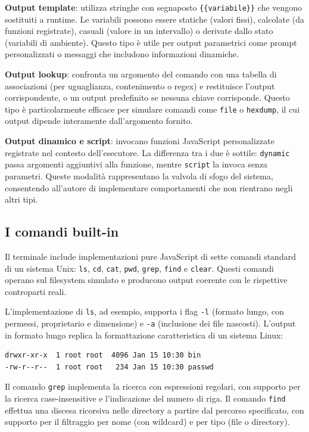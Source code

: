 \textbf{Output template}: utilizza stringhe con segnaposto \texttt{\{\{variabile\}\}} che vengono sostituiti a runtime. Le variabili possono essere statiche (valori fissi), calcolate (da funzioni registrate), casuali (valore in un intervallo) o derivate dallo stato (variabili di ambiente). Questo tipo è utile per output parametrici come prompt personalizzati o messaggi che includono informazioni dinamiche.

\textbf{Output lookup}: confronta un argomento del comando con una tabella di associazioni (per uguaglianza, contenimento o regex) e restituisce l'output corrispondente, o un output predefinito se nessuna chiave corrisponde. Questo tipo è particolarmente efficace per simulare comandi come \texttt{file} o \texttt{hexdump}, il cui output dipende interamente dall'argomento fornito.

\textbf{Output dinamico e script}: invocano funzioni JavaScript personalizzate registrate nel contesto dell'esecutore. La differenza tra i due è sottile: \texttt{dynamic} passa argomenti aggiuntivi alla funzione, mentre \texttt{script} la invoca senza parametri. Queste modalità rappresentano la valvola di sfogo del sistema, consentendo all'autore di implementare comportamenti che non rientrano negli altri tipi.

\subsection{I comandi built-in}

Il terminale include implementazioni pure JavaScript di sette comandi standard di un sistema Unix: \texttt{ls}, \texttt{cd}, \texttt{cat}, \texttt{pwd}, \texttt{grep}, \texttt{find} e \texttt{clear}. Questi comandi operano sul filesystem simulato e producono output coerente con le rispettive controparti reali.

L'implementazione di \texttt{ls}, ad esempio, supporta i flag \texttt{-l} (formato lungo, con permessi, proprietario e dimensione) e \texttt{-a} (inclusione dei file nascosti). L'output in formato lungo replica la formattazione caratteristica di un sistema Linux:

\begin{lstlisting}
drwxr-xr-x  1 root root  4096 Jan 15 10:30 bin
-rw-r--r--  1 root root   234 Jan 15 10:30 passwd
\end{lstlisting}

Il comando \texttt{grep} implementa la ricerca con espressioni regolari, con supporto per la ricerca case-insensitive e l'indicazione del numero di riga. Il comando \texttt{find} effettua una discesa ricorsiva nelle directory a partire dal percorso specificato, con supporto per il filtraggio per nome (con wildcard) e per tipo (file o directory).

